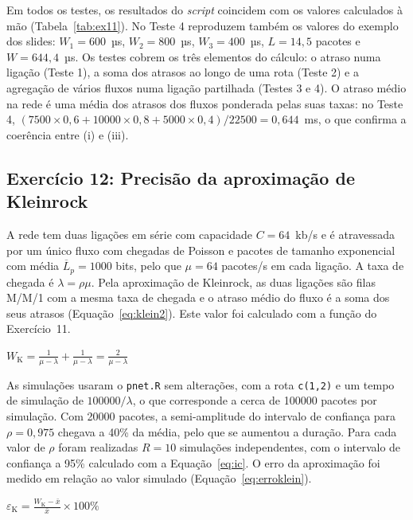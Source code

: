 \documentclass[10pt,a4paper]{article}
\newcommand{\formula}[3]{\begin{equacao}[H]\centering$\displaystyle #1$\caption{#2}\label{#3}\end{equacao}}
\begin{document}
Em todos os testes, os resultados do \textit{script} coincidem com os valores calculados à mão (Tabela~\ref{tab:ex11}). No Teste 4 reproduzem também os valores do exemplo dos slides: $W_1=600$~µs, $W_2=800$~µs, $W_3=400$~µs, $L=14{,}5$ pacotes e $W=644{,}4$~µs. Os testes cobrem os três elementos do cálculo: o atraso numa ligação (Teste 1), a soma dos atrasos ao longo de uma rota (Teste 2) e a agregação de vários fluxos numa ligação partilhada (Testes 3 e 4). O atraso médio na rede é uma média dos atrasos dos fluxos ponderada pelas suas taxas: no Teste 4, $(7500\times0{,}6+10000\times0{,}8+5000\times0{,}4)/22500=0{,}644$~ms, o que confirma a coerência entre (i) e (iii).


\subsection{Exercício 12: Precisão da aproximação de Kleinrock}

A rede tem duas ligações em série com capacidade $C=64$~kb/s e é atravessada por um único fluxo com chegadas de Poisson e pacotes de tamanho exponencial com média $\overline{L}_p=1000$ bits, pelo que $\mu=64$ pacotes/s em cada ligação. A taxa de chegada é $\lambda=\rho\mu$. Pela aproximação de Kleinrock, as duas ligações são filas M/M/1 com a mesma taxa de chegada e o atraso médio do fluxo é a soma dos seus atrasos (Equação~\ref{eq:klein2}). Este valor foi calculado com a função do Exercício~11.

\formula{W_{\mathrm{K}}=\frac{1}{\mu-\lambda}+\frac{1}{\mu-\lambda}=\frac{2}{\mu-\lambda}}{Atraso médio do fluxo nas duas ligações em série segundo a aproximação de Kleinrock.}{eq:klein2}

As simulações usaram o \texttt{pnet.R} sem alterações, com a rota \texttt{c(1,2)} e um tempo de simulação de $\num{100000}/\lambda$, o que corresponde a cerca de \num{100000} pacotes por simulação. Com \num{20000} pacotes, a semi-amplitude do intervalo de confiança para $\rho=0{,}975$ chegava a 40\% da média, pelo que se aumentou a duração. Para cada valor de $\rho$ foram realizadas $R=10$ simulações independentes, com o intervalo de confiança a 95\% calculado com a Equação~\ref{eq:ic}. O erro da aproximação foi medido em relação ao valor simulado (Equação~\ref{eq:erroklein}).

\formula{\varepsilon_{\mathrm{K}}=\frac{W_{\mathrm{K}}-\bar{x}}{\bar{x}}\times100\%}{Erro relativo da aproximação de Kleinrock face ao atraso médio simulado $\bar{x}$.}{eq:erroklein}
\end{document}
